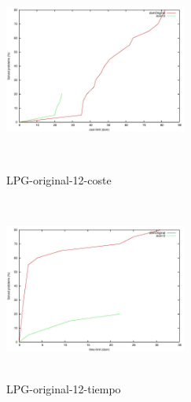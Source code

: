 \documentclass{article}
\begin{document}
\begin{figure}[!htb]
   \begin{minipage}{0.48\textwidth}
     \centering
     \includegraphics[width=6cm, height=6cm]{lpg-or-12-cost}
    \caption{LPG-original-12-coste}
   \end{minipage}\hfill
   \begin {minipage}{0.48\textwidth}
     \centering
     \includegraphics[width=6cm, height=6cm]{lpg-or-12-time}
    \caption{LPG-original-12-tiempo}
   \end{minipage}
\end{figure}
\end{document}
